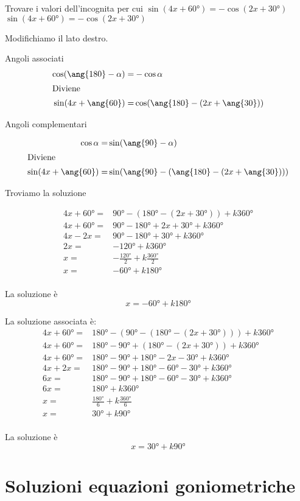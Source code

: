 \begin{exercise}
	Trovare i valori dell'incognita per cui $\sin(4x+\ang{60})=-\cos(2x+\ang{30})$
	\tcblower
$\sin(4x+\ang{60})=-\cos(2x+\ang{30})$
	
	Modifichiamo il lato destro.
	
	Angoli associati 
	\begin{align*}
	\cos(\ang{180}-\alpha)=&-\cos\alpha\\
	\intertext{Diviene}
	\sin(4x+\ang{60})=&\cos(\ang{180}-(2x+\ang{30}))
	\end{align*}	
	
	Angoli complementari
	
	\begin{align*}
	\cos\alpha=&\sin(\ang{90}-\alpha)\\
	\intertext{Diviene}
	\sin(4x+\ang{60})=&\sin(\ang{90}-(\ang{180}-(2x+\ang{30})))
	\end{align*}	
	
	Troviamo la soluzione
	
	\begin{align*}
	4x+\ang{60}=&\ang{90}-(\ang{180}-(2x+\ang{30}))+k\ang{360}\\
	4x+\ang{60}=&\ang{90}-\ang{180}+2x+\ang{30}+k\ang{360}\\
	4x-2x=&\ang{90}-\ang{180}+\ang{30}+k\ang{360}\\
	2x=&-\ang{120}+k\ang{360}\\
	x=&-\frac{\ang{120}}{2}+k\frac{\ang{360}}{2}\\
	x=&-\ang{60}+k\ang{180}\\
	\end{align*}
	
	La soluzione è
	\[x=-\ang{60}+k\ang{180}\]
	
	La soluzione associata è:
	\begin{align*}
	4x+\ang{60}=&\ang{180}-(\ang{90}-(\ang{180}-(2x+\ang{30})))+k\ang{360}\\
	4x+\ang{60}=&\ang{180}-\ang{90}+(\ang{180}-(2x+\ang{30}))+k\ang{360}\\
	4x+\ang{60}=&\ang{180}-\ang{90}+\ang{180}-2x-\ang{30}+k\ang{360}\\
	4x+2x=&\ang{180}-\ang{90}+\ang{180}-\ang{60}-\ang{30}+k\ang{360}\\
	6x=&\ang{180}-\ang{90}+\ang{180}-\ang{60}-\ang{30}+k\ang{360}\\
	6x=&\ang{180}+k\ang{360}\\
	x=&\frac{\ang{180}}{6}+k\frac{\ang{360}}{6}\\
	x=&\ang{30}+k\ang{90}\\
	\end{align*}
	
	La soluzione è
	\[x=\ang{30}+k\ang{90}\]
\end{exercise}
 \tcbstoprecording
 \newpage
 \section{Soluzioni equazioni goniometriche}
 \tcbinputrecords